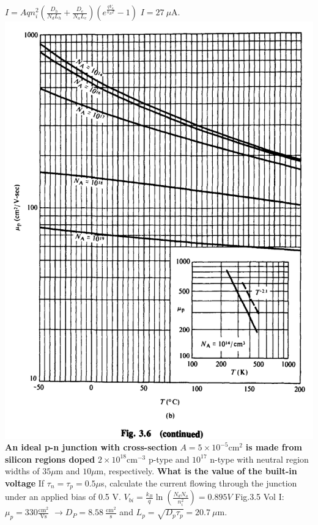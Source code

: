 \begin{multicols}{3}
$I=Aqn_i^2 \left(\frac{D_h}{N_dL_h}+\frac{D_e}{N_aL_e}\right)(e^{\frac{qV_a}{k_BT}}-1)$
$I=27 \ \mu$A.
          \medbreak\noindent\minipage{\columnwidth}
            \includegraphics[width=\columnwidth]{V1Figure3-6b.png}
        \endminipage\medbreak 
        \textbf{An ideal p-n junction with cross-section } $A=5\times 10^{-5} \text{cm}^2$ \textbf{is made from silicon regions doped } $2\times 10^{18} \text{cm}^{-3}$ p-type and $10^{17}$ n-type with neutral region widths of $35 \mu$m and $10 \mu$m, respectively. \textbf{What is the value of the built-in voltage} If $\tau_n=\tau_p=0.5 \mu$s, calculate the current flowing through the junction under an applied bias of 0.5 V.
        $V_{bi}=\frac{k_B}{q} \ln \left(\frac{N_d N_a}{n_i^2}\right)=0.895 V$
        Fig.3.5 Vol I: $\mu_p=330 \frac{\text{cm}^2}{\text{Vs}} $ 
        $\rightarrow D_P=8.58 \ \frac{\text{cm}^2}{\text{s}}$
        and $L_p=\sqrt{D_p \tau_p}=20.7 \ \mu$m. 
        

\end{multicols}
